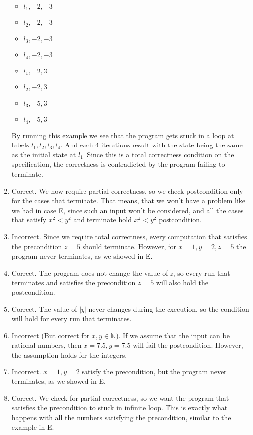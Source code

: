 \documentclass{article}
\begin{document}
\begin{enumerate}[label=\Alph*.]
\begin{itemize}
        \item $l_1, -2, -3$
        \item $l_2, -2, -3$
        \item $l_3, -2, -3$
        \item $l_4, -2, -3$
        \item $l_1, -2, 3$
        \item $l_2, -2, 3$
        \item $l_3, -5, 3$
        \item $l_4, -5, 3$
    \end{itemize}
    By running this example we see that the program gets stuck in a loop
    at labels $l_1, l_2, l_3, l_4$. And each 4 iterations result with the state
    being the same as the initial state at $l_1$.
    Since this is a total correctness condition on the specification,
    the correctness is contradicted by the program failing to terminate.
    \item Correct. We now require partial correctness, so we check postcondition only for the cases that terminate. That means, that we won't have a problem like we had in case E, since such an input won't be considered, and all the cases that satisfy $x^2<y^2$ and terminate hold $x^2<y^2$ postcondition.
    \item Incorrect. Since we require total correctness, every computation that satisfies the precondition $z=5$ should terminate. However, for $x=1, y=2, z=5$ the program never terminates, as we showed in E.
    \item Correct. The program does not change the value of $z$, so every run that terminates and satisfies the precondition $z=5$ will also hold the postcondition.
    \item Correct. The value of $|y|$ never changes during the execution, so the condition will hold for every run that terminates.
    \item Incorrect (But correct for $x,y \in \mathbb{N}$). If we assume that the input can be rational numbers, then $x=7.5, y=7.5$ will fail the postcondition. However, the assumption holds for the integers.
    \item Incorrect. $x=1, y=2$ satisfy the precondition, but the program never terminates, as we showed in E.
    \item Correct. We check for partial correctness, so we want the program that satisfies the precondition to stuck in infinite loop. This is exactly what happens with all the numbers satisfying the precondition, similar to the example in E.
\end{enumerate}
\end{document}
